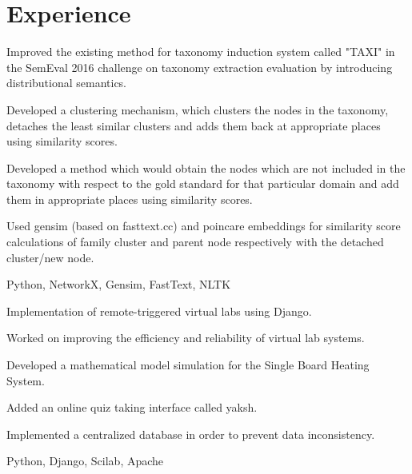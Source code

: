 
\section{Experience}

\vspace{\topsep} %
\begin{tightemize}
\item Improved the existing method for taxonomy induction system called "TAXI" in the SemEval 2016 challenge on taxonomy extraction evaluation by introducing distributional semantics.
\item Developed a clustering mechanism, which clusters the nodes in the taxonomy, detaches the least similar clusters and adds them back at appropriate places using similarity scores.
\item Developed a method which would obtain the nodes which are not included in the taxonomy with respect to the gold standard for that particular domain and add them in appropriate places using similarity scores.
\item Used gensim (based on fasttext.cc) and poincare embeddings for similarity score calculations of family cluster and parent node respectively with the detached cluster/new node.
\item {} Python, NetworkX, Gensim, FastText, NLTK
\end{tightemize}
\sectionsep

\begin{tightemize}
\item Implementation of remote-triggered virtual labs using Django.
\item Worked on improving the efficiency and reliability of virtual lab systems.
\item Developed a mathematical model simulation for the Single Board Heating System.
\item Added an online quiz taking interface called yaksh.
\item Implemented a centralized database in order to prevent data inconsistency.
\item {} Python, Django, Scilab, Apache
\end{tightemize}
\sectionsep